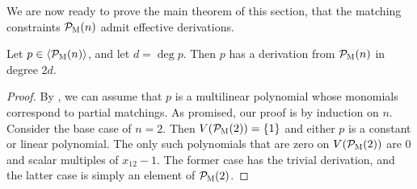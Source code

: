 We are now ready to prove the main theorem of this section, that the matching constraints $\mathcal P_{\textsc{M}}(n)$ admit effective derivations. 
\begin{theorem}\label{thm:matching-effective}
Let $p \in \langle \mathcal P_{\textsc{M}}(n) \rangle$, and let $d = \deg p$. Then $p$ has a derivation from $\mathcal P_{\textsc{M}}(n)$ in degree $2d$. 
\end{theorem}
\begin{proof}
By , we can assume that $p$ is a multilinear polynomial whose monomials correspond to partial matchings.
As promised, our proof is by induction on $n$. Consider the base case of $n = 2$. 
Then $V(\mathcal P_{\textsc{M}}(2)) = \{1\}$ and either $p$ is a constant or linear polynomial.
The only such polynomials that are zero on $V(\mathcal P_{\textsc{M}}(2))$ are $0$ and scalar multiples of $x_{12} - 1$. 
The former case has the trivial derivation, and the latter case is simply an element of $\mathcal P_{\textsc{M}}(2)$. 


\end{proof}
